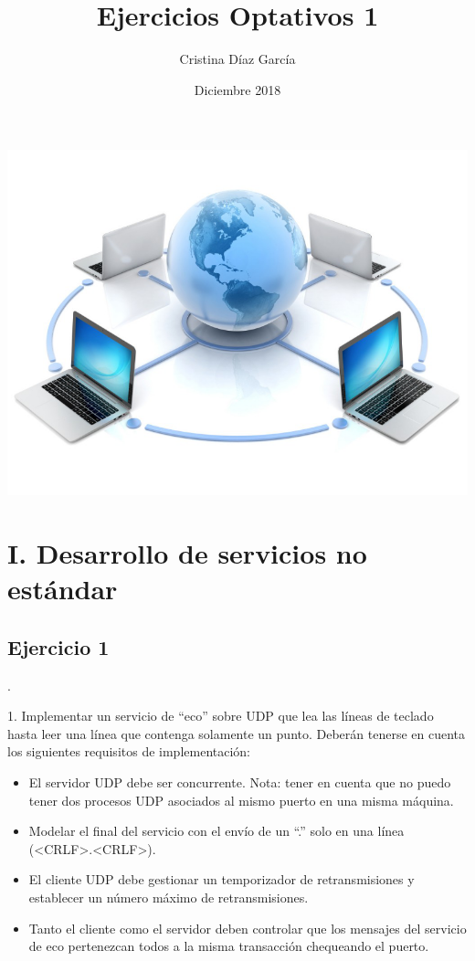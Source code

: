\documentclass{article}
\title{Ejercicios Optativos 1}
\author{Cristina Díaz García}
\date{Diciembre 2018}
\begin{document}

\begin{titlingpage}
\maketitle

\begin{center}
\includegraphics[scale=0.4]{images/comunicaciones.png} 
\end{center}

\end{titlingpage}

\newpage

\tableofcontents

\newpage

\section{I. Desarrollo de servicios no estándar}


\subsection{Ejercicio 1}.

1. Implementar un servicio de “eco” sobre UDP que lea las líneas de teclado hasta leer una
línea que contenga solamente un punto. Deberán tenerse en cuenta los siguientes requisitos de
implementación:
\begin{itemize}
\item El servidor UDP debe ser concurrente. Nota: tener en cuenta que no puedo tener dos
procesos UDP asociados al mismo puerto en una misma máquina.
\item Modelar el final del servicio con el envío de un “.” solo en una línea
(\textless{}CRLF\textgreater{}.\textless{}CRLF\textgreater{}).
\item El cliente UDP debe gestionar un temporizador de retransmisiones y establecer un
número máximo de retransmisiones.
\item Tanto el cliente como el servidor deben controlar que los mensajes del servicio de eco
pertenezcan todos a la misma transacción chequeando el puerto.
\end{itemize}
\end{document}
